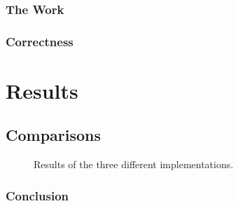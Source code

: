 \documentclass[]{report}
\begin{document}
\subsubsection{The Work}
\subsubsection{Correctness}

\section{Results}
\subsection{Comparisons}
\begin{figure}[h]
\caption{\label{fig:results} Results of the three different implementations.}
\end{figure}
\subsubsection{Conclusion}
\end{document}
